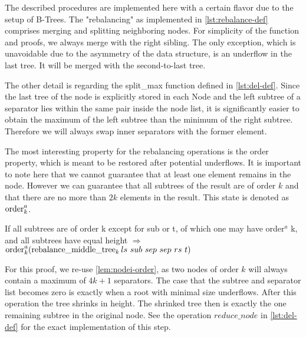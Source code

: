 The described procedures are implemented here with a
certain flavor due to the setup of B-Trees.
The "rebalancing" as implemented in \autoref{lst:rebalance-def}
comprises merging and splitting neighboring nodes.
For simplicity of the function and proofs, we always
merge with the right sibling.
The only exception, which is unavoidable due to the asymmetry of the data structure,
is an underflow in the last tree.
It will be merged with the second-to-last tree.

The other detail is regarding the split\_max function
defined in \autoref{lst:del-def}.
Since the last tree of the node is explicitly stored in each Node
and the left subtree of a separator lies within the same
pair inside the node list, it is significantly
easier to obtain the maximum of the left subtree
than the minimum of the right subtree.
Therefore we will always swap inner separators with the former element.

The most interesting property for the rebalancing operations is the order property,
which is meant to be restored after potential underflows.
It is important to note here that we cannot guarantee
that at least one element remains in the node.
However we can guarantee that all subtrees of the result are of order $k$
and that there are no more than $2k$ elements in the result.
This state is denoted as $\operatorname{order}^a_k$.

\begin{lemma}
    If all subtrees are of order k except for sub or t, of which one may have order$^a$ k,
    and all subtrees have equal height $\Longrightarrow$
    $\order^a_k (\rebalancemt_k ls\ sub\ sep\ sep\ rs\ t)$
\end{lemma}

For this proof, we re-use \autoref{lem:nodei-order},
as two nodes of order $k$ will always contain
a maximum of $4k+1$ separators.
The case that the subtree and separator list becomes zero
is exactly when a root with minimal size underflows.
After this operation the tree shrinks in height.
The shrinked tree then is exactly the one remaining subtree in the original node.
See the operation $reduce\_node$ in \autoref{lst:del-def} for the exact implementation
of this step.


